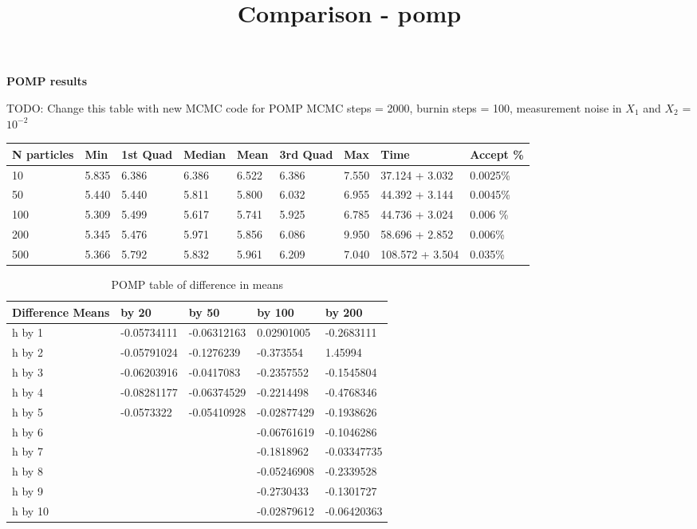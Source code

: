 \documentclass[a4paper,11pt]{article}
\begin{document}
\pagestyle{empty}
\title{Comparison - pomp}
\begin{center}
\Large\textbf{POMP results} \\[11pt]
\normalsize
\end{center}

TODO: Change this table with new MCMC code for POMP
MCMC steps = 2000, burnin steps = 100, measurement noise in $X_1$ and $X_2$ = $10^{-2}$

\begin{table}[h]
\centering
\begin{tabular}{lllllllll}
N particles & Min   & 1st Quad & Median & Mean  & 3rd Quad & Max   & Time            & Accept \% \\ \hline
10          & 5.835 & 6.386    & 6.386  & 6.522 & 6.386    & 7.550 & 37.124 + 3.032  & 0.0025\% \\
50          & 5.440 & 5.440    & 5.811  & 5.800 & 6.032    & 6.955 & 44.392 + 3.144  & 0.0045\% \\
100         & 5.309 & 5.499    & 5.617  & 5.741 & 5.925    & 6.785 & 44.736 + 3.024  & 0.006 \% \\
200         & 5.345 & 5.476    & 5.971  & 5.856 & 6.086    & 9.950 & 58.696 + 2.852  & 0.006\% \\
500         & 5.366 & 5.792    & 5.832  & 5.961 & 6.209    & 7.040 & 108.572 + 3.504 & 0.035\%            
\end{tabular}
\end{table}

\begin{table}[h]
\centering
\caption{POMP table of difference in means}
\begin{tabular}{|l|l|l|l|l|}
\hline
Difference Means & by 20       & by 50       & by 100      & by 200      \\ \hline
h by 1           & -0.05734111 & -0.06312163 & 0.02901005  & -0.2683111  \\ \hline
h by 2           & -0.05791024 & -0.1276239  & -0.373554   & 1.45994     \\ \hline
h by 3           & -0.06203916 & -0.0417083  & -0.2357552  & -0.1545804  \\ \hline
h by 4           & -0.08281177 & -0.06374529 & -0.2214498  & -0.4768346  \\ \hline
h by 5           & -0.0573322  & -0.05410928 & -0.02877429 & -0.1938626  \\ \hline
h by 6           &             &             & -0.06761619 & -0.1046286  \\ \hline
h by 7           &             &             & -0.1818962  & -0.03347735 \\ \hline
h by 8           &             &             & -0.05246908 & -0.2339528  \\ \hline
h by 9           &             &             & -0.2730433  & -0.1301727  \\ \hline
h by 10          &             &             & -0.02879612 & -0.06420363 \\ \hline
\end{tabular}
\end{table}
\end{document}
